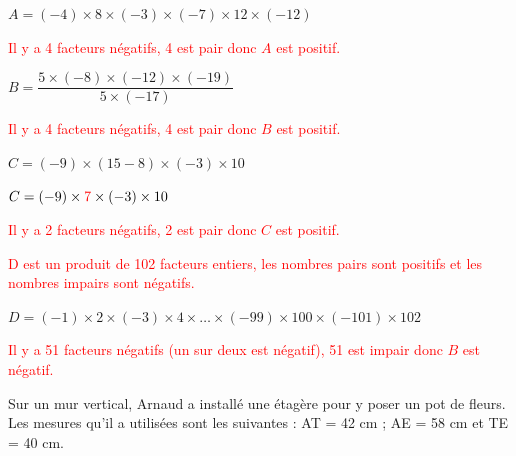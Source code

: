 \documentclass[a4paper]{book}
\begin{document}
{\begin{exercice}
\begin{enumerate}[leftmargin=*]
            \begin{minipage}{0.3\linewidth}
                $A=(-4)\times8\times(-3)\times(-7)\times12\times(-12)$

                \medskip

                \textcolor{red}{
                Il y a 4 facteurs négatifs, 4 est pair donc $A$ est positif.}
            \end{minipage}
            \hfill
            \vline
            \hfill
            \begin{minipage}{0.3\linewidth}
                $B=\dfrac{5\times(-8)\times(-12)\times(-19)}{5\times(-17)}$
                
                \medskip

                \textcolor{red}{
                Il y a 4 facteurs négatifs, 4 est pair donc $B$ est positif.}
            \end{minipage}
            \hfill
            \vline
            \hfill
            \begin{minipage}{0.3\linewidth}
                $C=(-9)\times(15-8)\times(-3)\times10$

                \medskip
                
                $C=(-9)\times\textcolor{red}{7}\times(-3)\times10$

                \textcolor{red}{
                Il y a 2 facteurs négatifs, 2 est pair donc $C$ est positif.}
            \end{minipage}
        \end{enumerate}  

        \medskip

        \textcolor{red}{
        D est un produit de 102 facteurs entiers, les nombres pairs sont positifs et les nombres impairs sont négatifs.}
        
        $D=(-1)\times2\times(-3)\times4\times\ldots\times(-99)\times100\times(-101)\times102$
                
        \medskip

        \textcolor{red}{
        Il y a 51 facteurs négatifs (un sur deux est négatif), 51 est impair donc $B$ est négatif.}
    \end{exercice}


    \begin{exercice}
        \begin{minipage}{0.7\linewidth}
            Sur un mur vertical, Arnaud a installé une étagère pour y poser un pot de fleurs. Les mesures qu'il a utilisées sont les suivantes : AT = 42 cm ; AE = 58 cm et TE = 40 cm.
            

\end{minipage}
\end{exercice}}
\end{document}
